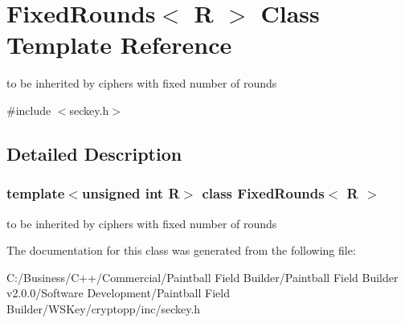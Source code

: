 \hypertarget{class_fixed_rounds}{
\section{FixedRounds$<$ R $>$ Class Template Reference}
\label{class_fixed_rounds}
}


to be inherited by ciphers with fixed number of rounds  


{\ttfamily \#include $<$seckey.h$>$}

\subsection{Detailed Description}
\subsubsection*{template$<$unsigned int R$>$ class FixedRounds$<$ R $>$}

to be inherited by ciphers with fixed number of rounds 

The documentation for this class was generated from the following file:\begin{DoxyCompactItemize}
\item 
C:/Business/C++/Commercial/Paintball Field Builder/Paintball Field Builder v2.0.0/Software Development/Paintball Field Builder/WSKey/cryptopp/inc/seckey.h\end{DoxyCompactItemize}
